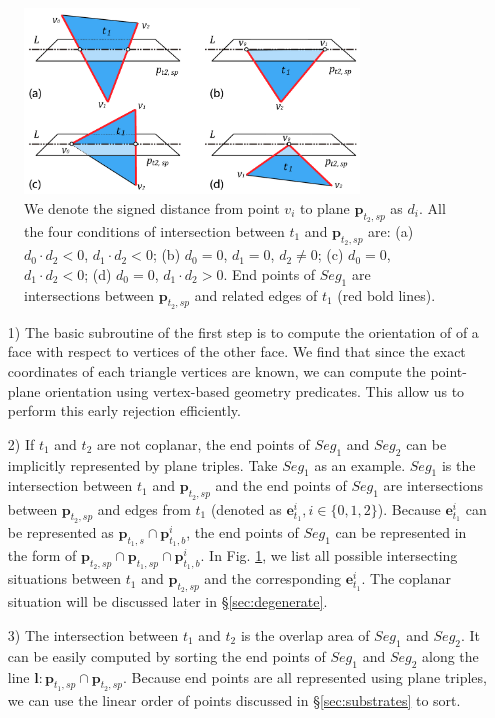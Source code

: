 \documentclass[10pt,journal,compsoc]{IEEEtran}
\begin{document}
\begin{figure}[t]
\centering
\includegraphics[width=3.5in]{sign}
\caption{We denote the signed distance from point $v_i$ to plane $\bm{p}_{t_2, sp}$ as $d_i$. All the four conditions of intersection between $t_1$ and $\bm{p}_{t_2, sp}$ are:  (a) $d_0\cdot d_2<0$, $d_1\cdot d_2<0$; (b) $d_0=0$, $d_1=0$, $d_2\neq 0$; (c) $d_0=0$, $d_1\cdot d_2<0$; (d) $d_0=0$, $d_1\cdot d_2>0$. End points of $Seg_1$ are intersections between $\bm{p}_{t_2, sp}$ and related edges of $t_1$ (red bold lines).}
\label{fig:isect}
\end{figure}



\begin{itemize}[leftmargin=0.45cm]
  \item[1)] The basic subroutine of the first step is to compute the orientation of of a face with respect to vertices of the other face. We find that since the exact coordinates of each triangle vertices are known, we can compute the point-plane orientation using vertex-based geometry predicates. This allow us to perform this early rejection efficiently.
      \vspace{0.5em}
  \item[2)] If $t_1$ and $t_2$ are not coplanar, the end points of $Seg_1$ and $Seg_2$ can be implicitly represented by plane triples. Take $Seg_1$ as an example. $Seg_1$ is the intersection between $t_1$ and $\bm{p}_{t_2, sp}$ and the end points of $Seg_1$ are intersections between $\bm{p}_{t_2, sp}$ and edges from $t_1$ (denoted as $\bm{e}^i_{t_1}, i\in\{0,1,2\}$). Because $\bm{e}^i_{t_1}$ can be represented as $\bm{p}_{t_1, s}\cap \bm{p}^i_{t_1, b}$, the end points of $Seg_1$ can be represented in the form of $\bm{p}_{t_2, sp} \cap \bm{p}_{t_1, sp} \cap \bm{p}^i_{t_1, b}$. In Fig. \ref{fig:isect}, we list all possible intersecting situations between $t_1$ and $\bm{p}_{t_2, sp}$ and the corresponding $\bm{e}^i_{t_1}$. The coplanar situation will be discussed later in \S \ref{sec:degenerate}.
      \vspace{0.5em}
 \item[3)] The intersection between $t_1$ and $t_2$ is the overlap area of $Seg_1$ and $Seg_2$. It can be easily computed by sorting the end points of $Seg_1$ and $Seg_2$ along the line $\bm{l}\colon \bm{p}_{t_1, sp} \cap \bm{p}_{t_2, sp}$. Because end points are all represented using plane triples, we can use the linear order of points discussed in \S \ref{sec:substrates} to sort.
\end{itemize}
\end{document}
